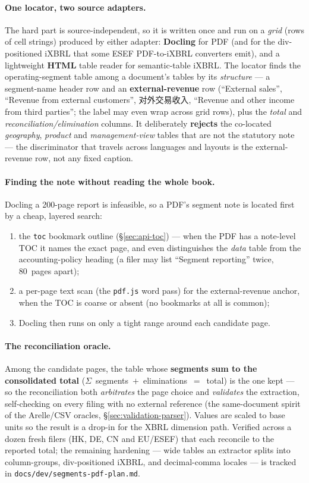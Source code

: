 \documentclass[11pt,a4paper]{report}
\newcommand{\cncjk}[2]{{\cjkCNfont #1}}
\begin{document}
\paragraph{One locator, two source adapters.} The hard part is source-independent, so it is written once and
run on a \emph{grid} (rows of cell strings) produced by either adapter: \textbf{Docling} for PDF (and for the
div-positioned iXBRL that some ESEF PDF-to-iXBRL converters emit), and a lightweight \textbf{HTML} table reader
for semantic-table iXBRL. The locator finds the operating-segment table among a document's tables by its
\emph{structure} --- a segment-name header row and an \textbf{external-revenue} row (``External sales'',
``Revenue from external customers'', \cncjk{对外交易收入}{external-transaction revenue}, ``Revenue and other
income from third parties''; the label may even wrap across grid rows), plus the \emph{total} and
\emph{reconciliation/elimination} columns. It deliberately \textbf{rejects} the co-located \emph{geography},
\emph{product} and \emph{management-view} tables that are not the statutory note --- the discriminator that
travels across languages and layouts is the external-revenue row, not any fixed caption.

\paragraph{Finding the note without reading the whole book.} Docling a 200-page report is infeasible, so a PDF's
segment note is located first by a cheap, layered search:
\begin{enumerate}
  \item the \texttt{toc} bookmark outline (\S\ref{sec:api-toc}) --- when the PDF has a note-level TOC it names
    the exact page, and even distinguishes the \emph{data} table from the accounting-policy heading (a filer
    may list ``Segment reporting'' twice, 80~pages apart);
  \item a per-page text scan (the \texttt{pdf.js} word pass) for the external-revenue anchor, when the TOC is
    coarse or absent (no bookmarks at all is common);
  \item Docling then runs on only a tight range around each candidate page.
\end{enumerate}

\paragraph{The reconciliation oracle.} Among the candidate pages, the table whose \textbf{segments sum to the
consolidated total} ($\Sigma$~segments~$+$~eliminations~$=$~total) is the one kept --- so the reconciliation
both \emph{arbitrates} the page choice and \emph{validates} the extraction, self-checking on every filing with
no external reference (the same-document spirit of the Arelle/CSV oracles, \S\ref{sec:validation-parser}).
Values are scaled to base units so the result is a drop-in for the XBRL dimension path. Verified across a dozen
fresh filers (HK, DE, CN and EU/ESEF) that each reconcile to the reported total; the remaining hardening ---
wide tables an extractor splits into column-groups, div-positioned iXBRL, and decimal-comma locales --- is
tracked in \texttt{docs/dev/segments-pdf-plan.md}.
\end{document}
